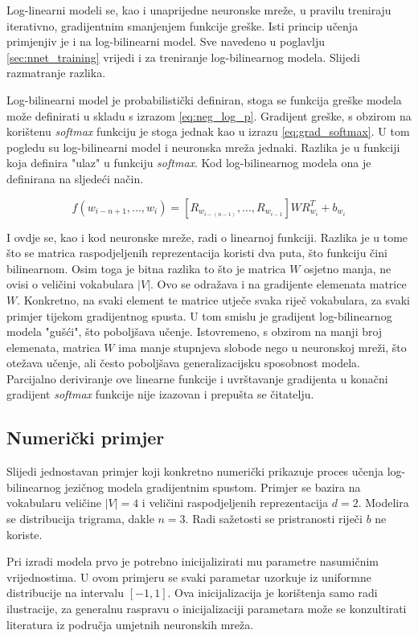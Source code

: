 \documentclass[times, utf8, diplomski, numeric]{fer}
\begin{document}
Log-linearni modeli se, kao i unaprijedne neuronske mreže, u pravilu treniraju iterativno, gradijentnim smanjenjem funkcije greške. Isti princip učenja primjenjiv je i na log-bilinearni model. Sve navedeno u poglavlju \ref{sec:nnet_training} vrijedi i za treniranje log-bilinearnog modela. Slijedi razmatranje razlika.

Log-bilinearni model je probabilistički definiran, stoga se funkcija greške modela može definirati u skladu s izrazom \ref{eq:neg_log_p}. Gradijent greške, s obzirom na korištenu \textit{softmax} funkciju je stoga jednak kao u izrazu \ref{eq:grad_softmax}. U tom pogledu su log-bilinearni model i neuronska mreža jednaki. Razlika je u funkciji koja definira "ulaz" u funkciju \textit{softmax}. Kod log-bilinearnog modela ona je definirana na sljedeći način.

\[
f(w_{i - n + 1}, ..., w_i) = \left[R_{w_{i - (n - 1)}}, ..., R_{w_{i - 1}}\right] W R_{w_i}^T + b_{w_i}
\]

I ovdje se, kao i kod neuronske mreže, radi o linearnoj funkciji. Razlika je u tome što se matrica raspodjeljenih reprezentacija koristi dva puta, što funkciju čini bilinearnom. Osim toga je bitna razlika to što je matrica $W$ osjetno manja, ne ovisi o veličini vokabulara $|V|$. Ovo se odražava i na gradijente elemenata matrice $W$. Konkretno, na svaki element te matrice utječe svaka riječ vokabulara, za svaki primjer tijekom gradijentnog spusta. U tom smislu je gradijent log-bilinearnog modela "gušći", što poboljšava učenje. Istovremeno, s obzirom na manji broj elemenata, matrica $W$ ima manje stupnjeva slobode nego u neuronskoj mreži, što otežava učenje, ali često poboljšava generalizacijsku sposobnost modela. Parcijalno deriviranje ove linearne funkcije i uvrštavanje gradijenta u konačni gradijent \textit{softmax} funkcije nije izazovan i prepušta se čitatelju.

\subsection{Numerički primjer}

Slijedi jednostavan primjer koji konkretno numerički prikazuje proces učenja log-bilinearnog jezičnog modela gradijentnim spustom. Primjer se bazira na vokabularu veličine $|V| = 4$ i veličini raspodjeljenih reprezentacija $d = 2$. Modelira se distribucija trigrama, dakle $n = 3$. Radi sažetosti se pristranosti riječi $b$ ne koriste.

Pri izradi modela prvo je potrebno inicijalizirati mu parametre nasumičnim vrijednostima. U ovom primjeru se svaki parametar uzorkuje iz uniformne distribucije na intervalu $[-1, 1]$. Ova inicijalizacija je korištenja samo radi ilustracije, za generalnu raspravu o inicijalizaciji parametara može se konzultirati literatura iz područja umjetnih neuronskih mreža.
\end{document}
